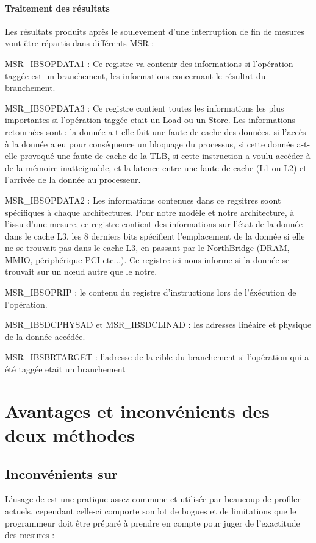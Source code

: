 			\paragraph{Traitement des résultats}
				Les résultats produits après le soulevement d'une interruption de fin de mesures vont être répartis dans différents MSR : 
				\bitem
					\item{MSR\_IBSOPDATA1 : Ce registre va contenir des informations si l'opération taggée est un branchement, les informations concernant le résultat du branchement.}
					\item{MSR\_IBSOPDATA3 : Ce registre contient toutes les informations les plus importantes si l'opération taggée etait un Load ou un Store. Les informations retournées sont : la donnée a-t-elle fait une faute de cache des données, si l'accès à la donnée a eu pour conséquence un bloquage du processus, si cette donnée a-t-elle provoqué une faute de cache de la TLB, si cette instruction a voulu accéder à de la mémoire inatteignable, et la latence entre une faute de cache (L1 ou L2) et l'arrivée de la donnée au processeur.}
					\item{MSR\_IBSOPDATA2 : Les informations contenues dans ce regsitres soont spécifiques à chaque architectures. Pour notre modèle et notre architecture, à l'issu d'une mesure, ce registre contient des informations sur l'état de la donnée dans le cache L3, les 8 derniers bits spécifient l'emplacement de la donnée si elle ne se trouvait pas dans le cache L3, en passant par le NorthBridge (DRAM, MMIO, périphérique PCI etc...). Ce registre ici nous informe si la donnée se trouvait sur un n\oe ud autre que le notre.}
					\item{MSR\_IBSOPRIP : le contenu du registre d'instructions lors de l'éxécution de l'opération.}
					\item{MSR\_IBSDCPHYSAD et MSR\_IBSDCLINAD : les adresses linéaire et physique de la donnée accédée.}
					\item{MSR\_IBSBRTARGET : l'adresse de la cible du branchement si l'opération qui a été taggée etait un branchement}
				\eitem
			\section{Avantages et inconvénients des deux méthodes}
				\subsection{Inconvénients sur \PMC}
					L'usage de \PMC est une pratique assez commune et utilisée par beaucoup de profiler actuels, cependant celle-ci comporte son lot de bogues et de limitations que le programmeur doit être préparé à prendre en compte pour juger de l'exactitude des mesures :
